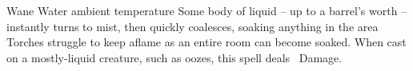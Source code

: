   {}%
  {Wane}%
  {Water}%
  {ambient temperature}%
  {Some body of liquid -- up to a barrel's worth -- instantly turns to mist, then quickly coalesces, soaking anything in the area}%
  {Torches struggle to keep aflame as an entire room can become soaked.
    When cast on a mostly-liquid creature, such as oozes, this spell deals \showDam~Damage.}

